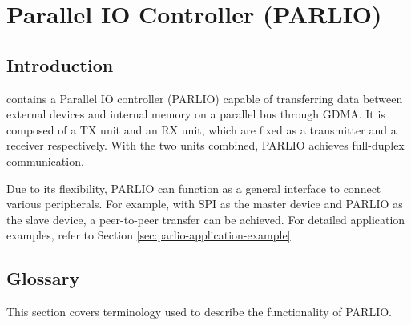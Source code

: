 \documentclass[main\_\_EN.tex]{subfiles}
\begin{document}

\ifglobal
\else
    \listoftodos
    {\let\clearpage\relax \listofdonetodos}
    \tableofcontents
\fi



\hypertarget{parlio}{}
\chapter{Parallel IO Controller (PARLIO)}
\label{mod:parlio}



\section{Introduction}

\chipname{} contains a Parallel IO controller (PARLIO) capable of transferring data between external devices and internal memory on a parallel bus through GDMA. It is composed of a TX unit and an RX unit, which are fixed as a transmitter and a receiver respectively. With the two units combined, PARLIO achieves full-duplex communication.

Due to its flexibility, PARLIO can function as a general interface to connect various peripherals. For example, with SPI as the master device and PARLIO as the slave device, a peer-to-peer transfer can be achieved. For detailed application examples, refer to Section \ref{sec:parlio-application-example}.


\section{Glossary}
This section covers terminology used to describe the functionality of PARLIO.
\end{document}
